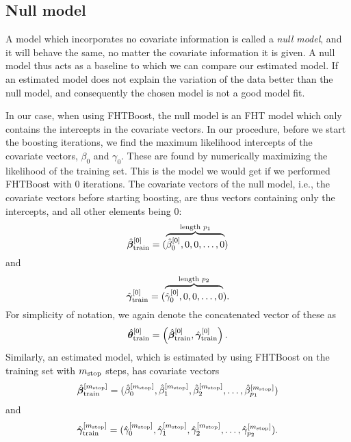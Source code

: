 \subsection{Null model}
A model which incorporates no covariate information is called a \textit{null model}, and it will behave the same, no matter the covariate information it is given.
A null model thus acts as a baseline to which we can compare our estimated model.
If an estimated model does not explain the variation of the data better than the null model, and consequently the chosen model is not a good model fit.

In our case, when using FHTBoost, the null model is an FHT model which only contains the intercepts in the covariate vectors.
In our procedure, before we start the boosting iterations, we find the maximum likelihood intercepts of the covariate vectors, $\beta_0$ and $\gamma_0$.
These are found by numerically maximizing the likelihood of the training set.
This is the model we would get if we performed FHTBoost with 0 iterations.
The covariate vectors of the null model, i.e., the covariate vectors before starting boosting, are thus vectors containing only the intercepts, and all other elements being 0:
\begin{equation*}
    \hat{\boldsymbol{\beta}}^{[0]}_{\text{train}}=(\overbrace{\hat{\beta}_0^{[0]},0,0,\ldots,0}^{\text{length }p_1})
\end{equation*}
and
\begin{equation*}
    \hat{\boldsymbol{\gamma}}^{[0]}_{\text{train}}=(\overbrace{\hat{\gamma}_0^{[0]},0,0,\ldots,0}^{\text{length }p_2}).
\end{equation*}
For simplicity of notation, we again denote the concatenated vector of these as
\begin{equation*}
    \hat{\boldsymbol{\theta}}^{[0]}_{\text{train}}=\left(\hat{\boldsymbol{\beta}}_{\text{train}}^{[0]},\hat{\boldsymbol{\gamma}}_{\text{train}}^{[0]}\right).
\end{equation*}
Similarly, an estimated model, which is estimated by using FHTBoost on the training set with $m_{\text{stop}}$ steps, has covariate vectors
\begin{equation*}
    \hat{\boldsymbol{\beta}}^{[m_{\text{stop}}]}_{\text{train}}=(\hat{\beta}_0^{[m_{\text{stop}}]},\hat{\beta}_1^{[m_{\text{stop}}]},\hat{\beta}_2^{[m_{\text{stop}}]},\ldots,\hat{\beta}_{p_1}^{[m_{\text{stop}}]})
\end{equation*}
and
\begin{equation*}
    \hat{\boldsymbol{\gamma}}^{[m_{\text{stop}}]}_{\text{train}}=(\hat{\gamma}_0^{[m_{\text{stop}}]},\hat{\gamma}_1^{[m_{\text{stop}}]},\hat{\gamma}_2^{[m_{\text{stop}}]},\ldots,\hat{\gamma}_{p_2}^{[m_{\text{stop}}]}).
\end{equation*}
